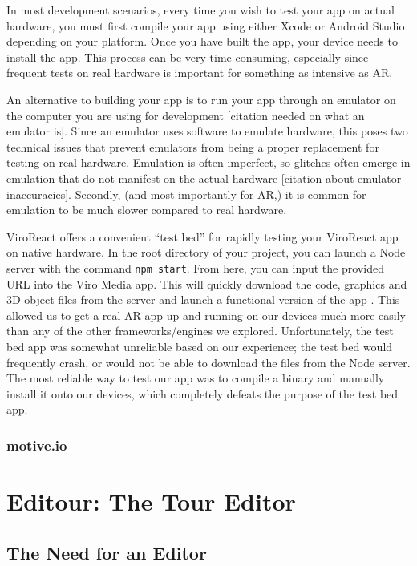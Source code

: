 \documentclass[a4paper, 10pt, american]{article}
\begin{document}
In most development scenarios, every time you wish to test your app on actual
hardware, you must first compile your app using either Xcode or Android Studio
depending on your platform. Once you have built the app, your device needs to
install the app. This process can be very time consuming, especially since
frequent tests on real hardware is important for something as intensive as
AR.

An alternative to building your app is to run your app through an emulator on
the computer you are using for development [citation needed on what an
emulator is]. Since an emulator uses software to emulate hardware, this poses
two technical issues that prevent emulators from being a proper replacement
for testing on real hardware.  Emulation is often imperfect, so glitches often
emerge in emulation that do not manifest on the actual hardware [citation
about emulator inaccuracies]. Secondly, (and most importantly for AR,)
it is common for emulation to be much slower compared to real hardware.

ViroReact offers a convenient ``test bed'' for rapidly testing your ViroReact
app on native hardware. In the root directory of your project, you can launch
a Node server with the command \texttt{npm start}. From here, you can input
the provided URL into the Viro Media app. This will quickly download the code,
graphics and 3D object files from the server and launch a functional version
of the app \autocite{viro-testbed2019}. This allowed us to get a real AR app
up and running on our devices much more easily than any of the other
frameworks/engines we explored. Unfortunately, the test bed app was somewhat
unreliable based on our experience; the test bed would frequently crash,
or would not be able to download the files from the Node server. The most
reliable way to test our app was to compile a binary and manually install it
onto our devices, which completely defeats the purpose of the test bed app.

\subsubsection{motive.io}
\label{sec:motive.io}

\section{Editour: The Tour Editor}
\label{sec:editour}

\subsection{The Need for an Editor}
\end{document}

